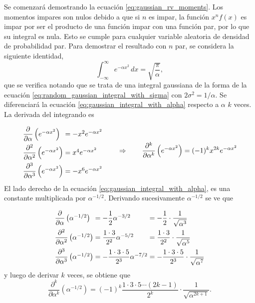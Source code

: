 \documentclass[a4paper]{report}
\begin{document}
Se comenzará demostrando la ecuación \ref{eq:gaussian_rv_moments}. Los momentos impares son nulos debido a que si \(n\) es impar, la función \(x^nf(x)\) es impar por ser el producto de una función impar con una función par, por lo que su integral es nula. Esto se cumple para cualquier variable aleatoria de densidad de probabilidad par. Para demostrar el resultado con \(n\) par, se considera la siguiente identidad,
\begin{equation}\label{eq:gaussian_integral_with_alpha}
 \int_{-\infty}^{\infty}e^{-\alpha x^2}\,dx=\sqrt{\frac{\pi}{\alpha}},
\end{equation}
que se verifica notando que se trata de una integral gaussiana de la forma de la ecuación \ref{eq:random_gaussian_integral_with_sigma} con \(2\sigma^2=1/\alpha\). Se diferenciará la ecuación \ref{eq:gaussian_integral_with_alpha} respecto a \(\alpha\) \(k\) veces. La derivada del integrando es
\[\arraycolsep=1.4pt\def\arraystretch{2.2}
 \begin{array}{lll}
  \dfrac{\partial}{\partial \alpha}\left(e^{-\alpha x^2}\right)&=&-x^2e^{-\alpha x^2}\\
  \dfrac{\partial^2}{\partial \alpha^2}\left(e^{-\alpha x^2}\right)&=&x^4e^{-\alpha x^2}\\
  \dfrac{\partial^3}{\partial \alpha^3}\left(e^{-\alpha x^2}\right)&=&-x^6e^{-\alpha x^2}
 \end{array}
 \qquad
 \Rightarrow
 \qquad
 \dfrac{\partial^k}{\partial \alpha^k}\left(e^{-\alpha x^2}\right)=(-1)^kx^{2k}e^{-\alpha x^2}
\]
El lado derecho de la ecuación \ref{eq:gaussian_integral_with_alpha}, es una constante multiplicada por \(\alpha^{-1/2}\). Derivando sucesivamente \(\alpha^{-1/2}\) se ve que
\[\arraycolsep=1.4pt\def\arraystretch{2.2}
 \begin{array}{lllll}
  \dfrac{\partial}{\partial \alpha}\left(\alpha^{-1/2}\right)&
     =&-\dfrac{1}{2}\alpha^{-3/2}&=&-\dfrac{1}{2}\cdot\dfrac{1}{\sqrt{\alpha^3}}\\
  \dfrac{\partial^2}{\partial \alpha^2}\left(\alpha^{-1/2}\right)&
     =&\dfrac{1\cdot 3}{2^2}\alpha^{-5/2}&=&\dfrac{1\cdot 3}{2^2}\cdot\dfrac{1}{\sqrt{\alpha^5}}\\
  \dfrac{\partial^3}{\partial \alpha^3}\left(\alpha^{-1/2}\right)&
     =&-\dfrac{1\cdot 3\cdot 5}{2^3}\alpha^{-7/2}&=&-\dfrac{1\cdot 3\cdot 5}{2^3}\cdot\dfrac{1}{\sqrt{\alpha^7}}
 \end{array}
\]
y luego de derivar \(k\) veces, se obtiene que
\[
 \frac{\partial^k}{\partial \alpha^k}\left(\alpha^{-1/2}\right)=(-1)^k\dfrac{1\cdot 3\cdot 5\cdots(2k-1)}{2^k}\cdot\dfrac{1}{\sqrt{\alpha^{2k+1}}}.
\]
\end{document}
